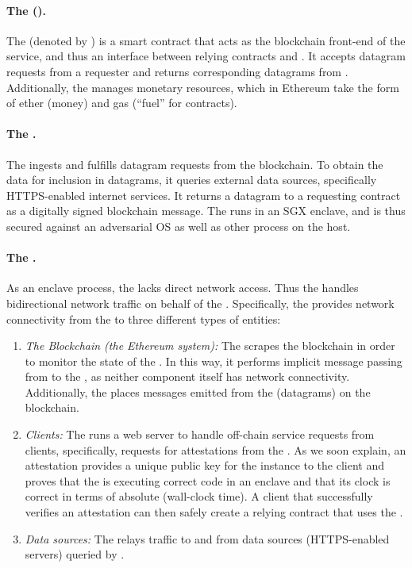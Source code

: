 \paragraph{The \tcontract (\tcont).} The \tcontract (denoted by \tcont) is a smart contract that acts as the blockchain front-end of the \tc service, and thus an interface between relying contracts and \tc. It accepts datagram requests from a requester \reqcont and returns corresponding datagrams from \tc. Additionally, the \tcontract manages \tc monetary resources, which in Ethereum take the form of ether (money) and gas (``fuel'' for contracts). 

\paragraph{The \encname.}
The \encname ingests and fulfills datagram requests from the blockchain. To obtain the data for inclusion in datagrams, it queries external data sources, specifically HTTPS-enabled internet services. It returns a datagram to a requesting contract \reqcont as a digitally signed blockchain message. The \encname runs in an SGX enclave, and is thus secured against an adversarial OS as well as other process on the host. 

\paragraph{The \medname.} As an enclave process, the \encname lacks direct network access. Thus the \medname handles bidirectional network traffic on behalf of the \encname. Specifically, the \medname provides network connectivity from the \encname to three different types of entities: 

\begin{enumerate}
\item {\em The Blockchain (the Ethereum system):}  The \medname scrapes the blockchain in order to monitor the state of the \tcontract  \tcont. In this way, it performs implicit message passing from \tcont to the \encname, as neither component itself has network connectivity. Additionally, the \medname places messages emitted from the \encname (datagrams) on the blockchain.
\item {\em Clients:} The \medname runs a web server to handle off-chain service requests from clients, specifically, requests for attestations from the \encname. As we soon explain, an attestation provides a unique public key for the \encname instance to the  client and proves that the \encname is executing correct code in an enclave and that its clock is correct in terms of absolute (wall-clock time). A client that successfully verifies an attestation can then safely create a relying contract \reqcont that uses the \tc.
\item {\em Data sources:} The \medname relays traffic to and from data sources (HTTPS-enabled servers) queried by \encname. 
\end{enumerate}

